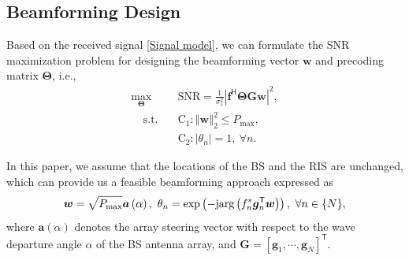 \documentclass[journal,twocolumn]{IEEEtran}
\theoremstyle{nonumberplain}
\def \T {\bm \Theta}
\def \exp {\text{exp}}
\def \arg {\text{arg}}
\def \T {^{\mathsf{T}}}
\def \H {^{\mathsf{H}}}
\begin{document}
        \subsection{Beamforming Design}
        \label{Beamforming design}
        Based on the received signal \eqref{Signal model}, we can formulate the \ac{SNR} maximization problem for designing the beamforming vector $\bm w$ and precoding matrix $\bm \Theta$, i.e.,
        \begin{subequations}
            \label{optimization}
            \begin{align}
            \label{objective}
                \max_{\bm \Theta}~~&\text{SNR}=\frac{1}{\sigma_{z}^{2}}
                \left\vert
                \bm f\H\bm \Theta\bm G\bm w \right\vert^{2},\\
            \label{constraint}
                ~~~~~\text{s.t.~~~}&\text{C}_{1}: \left\Vert \bm w\right \Vert_{2}^{2}\leq P_{\text{max}},\\
                &\text{C}_{2}: \left\vert\theta_{n}\right\vert=1,~\forall n.
            \end{align}
        \end{subequations}
        
    In this paper, we assume that the locations of the \ac{BS} and the RIS are unchanged, which can provide us a feasible beamforming approach expressed as
    \begin{equation}
        \label{traditional beamforming}
        \bm w=\sqrt{P_{\rm max}}\bm a\left(\alpha\right),~ \theta_{n} = \exp\left(-{\rm j} \arg\left(f_{n}^{*}\bm g_{n}\T \bm w\right)\right),~\forall n\in \{N\},
    \end{equation}
    where $\bm a(\alpha)$ denotes the array steering vector with respect to the wave departure angle $\alpha$ of the BS antenna array, and $\bm G = \left[\bm g_{1}, \cdots, \bm g_{N}\right]\T$. 
\end{document}
